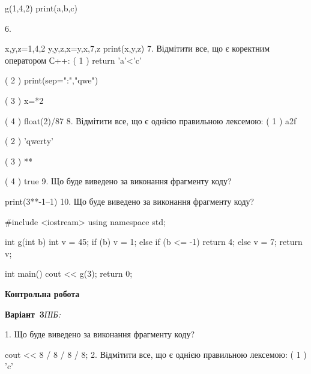 \documentclass[11pt]{article}
\begin{document}
g(1,4,2)
print(a,b,c)

\vspace{5mm}
6. 

x,y,z=1,4,2
y,y,z,x=y,x,7,z
print(x,y,z)
\vspace{5mm}
7. %
Відмітити все, що є коректним оператором С++:
( 1 ) return 'a'<'c'

( 2 ) print(sep=":","qwe")

( 3 ) x=*2

( 4 ) float(2)/87
\vspace{5mm}
8. %
Відмітити все, що є однією правильною лексемою:
( 1 ) a2f

( 2 ) 'qwerty'

( 3 ) **

( 4 ) true
\vspace{5mm}
9. Що буде виведено за виконання фрагменту коду?

print(3**-1--1)
\vspace{5mm}
10. Що буде виведено за виконання фрагменту коду?

#include <iostream>
using namespace std;

int g(int b){
    int v = 45;
    if (b) 
        v = 1;
    else if (b <= -1)
         return 4;
    else
         v = 7;
    return v;
}

int main(){
    cout << g(3);
    return 0;
}

\vspace{5mm}










\newpage

\newpage

{\large\textbf{Контрольна робота}}

\textbf{Варіант \No\,3}\hfill \textit{ПІБ:}\,\underline{\hspace{60mm}}
\vspace{4mm}

1. Що буде виведено за виконання фрагменту коду?

cout << 8 / 8 / 8 / 8;
\vspace{5mm}
2. %
Відмітити все, що є однією правильною лексемою:
( 1 ) 'c'
\end{document}
